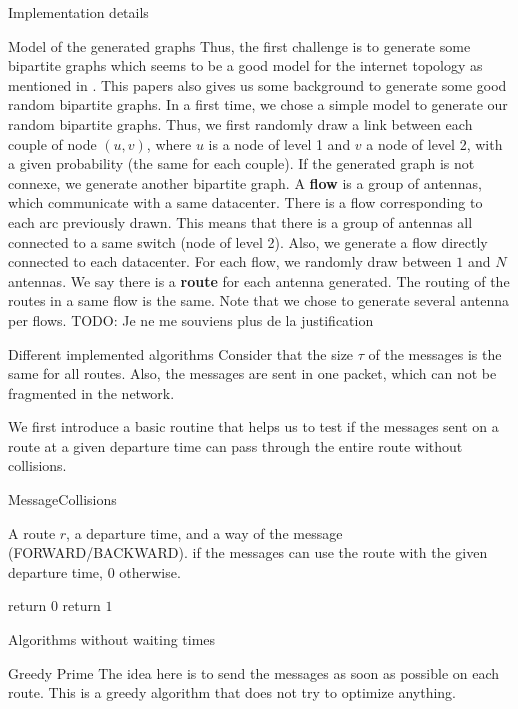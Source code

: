 \documentclass[10pt]{article}
\newcommand{\todo}[1]{{\color{red} TODO: {#1}}}
\begin{document}
\begin{section}{Implementation details}
\begin{subsection}{Model of the generated graphs}
  Thus, the first challenge is to generate some bipartite graphs which seems to be a good model for the internet topology as mentioned in \cite{tarissan_towards_2013}. This papers also gives us some background to generate some good random bipartite graphs. In a first time, we chose a simple model to generate our random bipartite graphs. Thus, we first randomly draw a link between each couple of node $(u,v)$, where $u$ is a node of level 1 and $v$ a node of level 2, with a given probability (the same for each couple). If the generated graph is not connexe, we generate another bipartite graph.
 A {\bf flow} is a group of antennas, which communicate with a same datacenter.   There is a flow corresponding to each arc previously drawn. This means that there is a group of antennas all connected to a same switch (node of level 2). Also, we generate a flow directly connected to each datacenter. For each flow, we randomly draw between $1$ and $N$ antennas.
  We say there is a {\bf route} for each antenna generated. The routing of the routes in a same flow is the same. 
  Note that we chose to generate several antenna per flows. \todo{Je ne me souviens plus de la justification}
  
  \end{subsection}
  
  \begin{subsection}{Different implemented algorithms}
  Consider that the size $\tau$ of the messages is the same for all routes. Also, the messages are sent in one packet, which can not be fragmented in the network.
  
  We first introduce a basic routine that helps us to test if the messages sent on a route at a given departure time can pass through the entire route without collisions.
  
    	\begin{algorithm}[H]
 	\caption{MessageCollisions}
 	\begin{algorithmic}
 	\REQUIRE A route $r$, a departure time, and a way of the message (FORWARD/BACKWARD).
	 if the messages can use the route with the given departure time, $0$ otherwise.

 	\STATE return $0$
 	\ENDIF
 	\ENDFOR
	\STATE return $1$
 	\end{algorithmic}
 	\end{algorithm}
  \begin{subsection}{Algorithms without waiting times}
  \begin{subsubsection}{Greedy Prime}
  The idea here is to send the messages as soon as possible on each route. This is a greedy algorithm that does not try to optimize anything.


\end{subsubsection}
\end{subsection}
\end{subsection}
\end{section}
\end{document}
